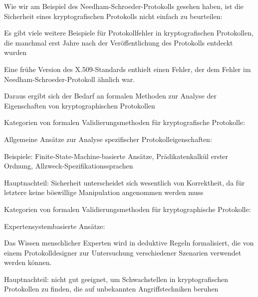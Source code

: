 \documentclass[a4paper]{article}
\begin{document}
\begin{multicols}{3}
      \begin{itemize*}
            \item Wie wir am Beispiel des Needham-Schroeder-Protokolls gesehen haben,
            ist die Sicherheit eines kryptografischen Protokolls nicht einfach zu
            beurteilen:
            \begin{itemize*}
                  \item Es gibt viele weitere Beispiele für Protokollfehler in kryptografischen Protokollen, die manchmal erst Jahre nach der Veröffentlichung des Protokolls entdeckt wurden
                  \begin{itemize*} \item Eine frühe Version des X.509-Standards enthielt einen Fehler, der dem Fehler im Needham-Schroeder-Protokoll ähnlich war. \end{itemize*}
                  \item Daraus ergibt sich der Bedarf an formalen Methoden zur Analyse der Eigenschaften von kryptographischen Protokollen
            \end{itemize*}
            \item Kategorien von formalen Validierungsmethoden für kryptografische
            Protokolle:
            \begin{itemize*}
                  \item Allgemeine Ansätze zur Analyse spezifischer Protokolleigenschaften:
                  \begin{itemize*} \item Beispiele: Finite-State-Machine-basierte Ansätze, Prädikatenkalkül erster Ordnung, Allzweck-Spezifikationssprachen \item Hauptnachteil: Sicherheit unterscheidet sich wesentlich von Korrektheit, da für letztere keine böswillige Manipulation angenommen werden muss \end{itemize*}
            \end{itemize*}
            \item Kategorien von formalen Validierungsmethoden für kryptographische
            Protokolle:
            \begin{itemize*}
                  \item Expertensystembasierte Ansätze:
                  \begin{itemize*} \item Das Wissen menschlicher Experten wird in deduktive Regeln formalisiert, die von einem Protokolldesigner zur Untersuchung verschiedener Szenarien verwendet werden können. \item Hauptnachteil: nicht gut geeignet, um Schwachstellen in kryptografischen Protokollen zu finden, die auf unbekannten Angriffstechniken beruhen \end{itemize*}

\end{itemize*}
\end{itemize*}
\end{multicols}
\end{document}
